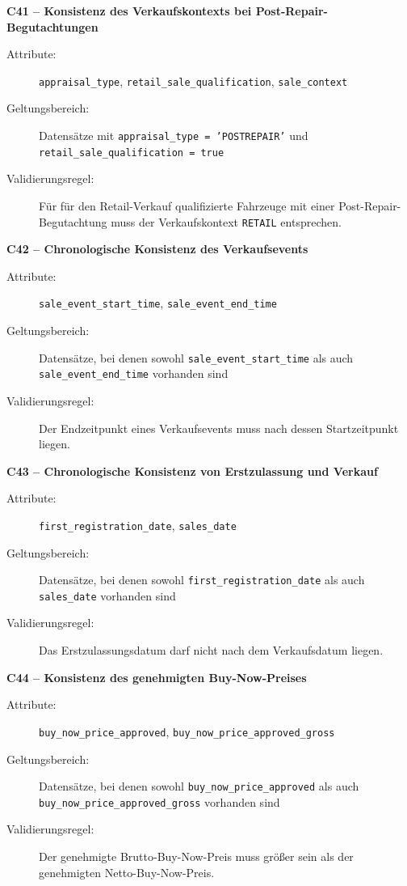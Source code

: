 \documentclass[../main.tex]{subfiles}
\begin{document}
\medskip 
\noindent\textbf{C41 -- Konsistenz des Verkaufskontexts bei Post-Repair-Begutachtungen} 
\begin{description}  
    \item[Attribute:] \texttt{appraisal\_type}, \texttt{retail\_sale\_qualification}, \texttt{sale\_context} 
    \item[Geltungsbereich:] Datensätze mit \texttt{appraisal\_type = 'POSTREPAIR'} und \texttt{retail\_sale\_qualification = true} 
    \item[Validierungsregel:] Für für den Retail-Verkauf qualifizierte Fahrzeuge mit einer Post-Repair-Begutachtung muss der Verkaufskontext \texttt{RETAIL} entsprechen. 
\end{description} 

\medskip 
\noindent\textbf{C42 -- Chronologische Konsistenz des Verkaufsevents} 
\begin{description} 
    \item[Attribute:] \texttt{sale\_event\_start\_time}, \texttt{sale\_event\_end\_time} 
    \item[Geltungsbereich:] Datensätze, bei denen sowohl \texttt{sale\_event\_start\_time} als auch \texttt{sale\_event\_end\_time} vorhanden sind 
    \item[Validierungsregel:] Der Endzeitpunkt eines Verkaufsevents muss nach dessen Startzeitpunkt liegen. 
\end{description} 

\medskip 
\noindent\textbf{C43 -- Chronologische Konsistenz von Erstzulassung und Verkauf} 
\begin{description} 
    \item[Attribute:] \texttt{first\_registration\_date}, \texttt{sales\_date} 
    \item[Geltungsbereich:] Datensätze, bei denen sowohl \texttt{first\_registration\_date} als auch \texttt{sales\_date} vorhanden sind 
    \item[Validierungsregel:] Das Erstzulassungsdatum darf nicht nach dem Verkaufsdatum liegen. 
\end{description} 

\medskip 
\noindent\textbf{C44 -- Konsistenz des genehmigten Buy-Now-Preises} 
\begin{description} 
    \item[Attribute:] \texttt{buy\_now\_price\_approved}, \texttt{buy\_now\_price\_approved\_gross} 
    \item[Geltungsbereich:] Datensätze, bei denen sowohl \texttt{buy\_now\_price\_approved} als auch \texttt{buy\_now\_price\_approved\_gross} vorhanden sind 
    \item[Validierungsregel:] Der genehmigte Brutto-Buy-Now-Preis muss größer sein als der genehmigten Netto-Buy-Now-Preis. 
\end{description} 
\end{document}
